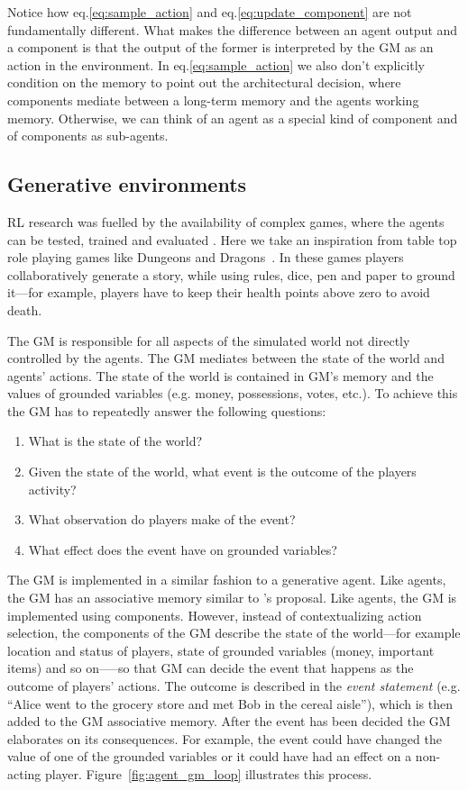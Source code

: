 \documentclass[11pt, a4paper, logo, twocolumn, internal, copyright, numbering]{googledeepmind}
\begin{document}
Notice how eq.\ref{eq:sample_action} and eq.\ref{eq:update_component} are not fundamentally different. 
What makes the difference between an agent output and a component is that the output of the former is interpreted by the GM as an action in the environment. 
In eq.\ref{eq:sample_action} we also don't explicitly condition on the memory to point out the architectural decision, where components mediate between a long-term memory and the agents working memory.
Otherwise, we can think of an agent as a special kind of component and of components as sub-agents.

\subsection{Generative environments}
\label{section:generativeEnvironments}

RL research was fuelled by the availability of complex games, where the agents can be tested, trained and evaluated \citep{bellemare2013arcade, jaderberg2019human, vinyals2019grandmaster}.
Here we take an inspiration from table top role playing games like Dungeons and Dragons~\citep{gyraxcook1989dnd}. In these games players collaboratively generate a story, while using rules, dice, pen and paper to ground it---for example, players have to keep their health points above zero to avoid death.

The GM is responsible for all aspects of the simulated world not directly controlled by the agents. The GM mediates between the state of the world and agents' actions. The state of the world is contained in GM's memory and the values of grounded variables (e.g. money, possessions, votes, etc.). To achieve this the GM has to repeatedly answer the following questions:
\begin{enumerate}
    \item What is the state of the world? 
    \item Given the state of the world, what event is the outcome of the players activity?
    \item What observation do players make of the event?
    \item What effect does the event have on grounded variables?
\end{enumerate}

The GM is implemented in a similar fashion to a generative agent. Like agents, the GM has an associative memory similar to \cite{park2023generative}'s proposal. Like agents, the GM is implemented using components. However, instead of contextualizing action selection, the components of the GM describe the state of the world---for example location and status of players, state of grounded variables (money, important items) and so on--—so that GM can decide the event that happens as the outcome of players' actions. 
The outcome is described in the \textit{event statement} (e.g. ``Alice went to the grocery store and met Bob in the cereal aisle''), which is then added to the GM associative memory. After the event has been decided the GM elaborates on its consequences. For example, the event could have changed the value of one of the grounded variables or it could have had an effect on a non-acting player. Figure~\ref{fig:agent_gm_loop} illustrates this process.
\end{document}
